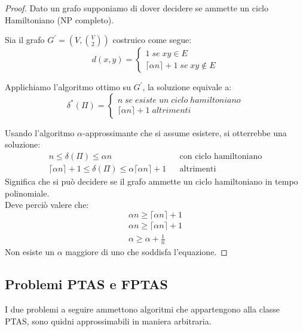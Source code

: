 \begin{proof}
    Dato un grafo supponiamo di dover decidere se ammette un ciclo Hamiltoniano (NP completo).

    Sia il grafo $G^\prime = (V, \binom{V}{2})$ costruico come segue:
    \[
        d(x,y) =     
        \begin{cases}
            1\;\mathit{se}\;xy \in E\\ 
            \lceil {\alpha n} \rceil + 1\;\mathit{se}\;xy \notin E        

        \end{cases}
    \]
    
    Applichiamo l'algoritmo ottimo su $G^\prime$, la soluzione equivale a:
    \[
        \delta^*(\Pi) =    
        \begin{cases}
            n\;\mathit{se\;esiste\;un\;ciclo\;hamiltoniano}\\ 
            \lceil \alpha n \rceil+ 1 \;\mathit{altrimenti}
        \end{cases}
    \]

    Usando l'algoritmo $\alpha$-approssimante che si assume esistere, 
    si otterrebbe una soluzione:
    \begin{equation}
        \begin{aligned}
            n \leq \delta(\Pi) \leq \alpha n && \text{con ciclo hamiltoniano}\\
            \lceil\alpha n \rceil+ 1 \leq \delta(\Pi) \leq \alpha\lceil \alpha n \rceil+ 1 && \text{altrimenti}
        \end{aligned}
    \end{equation}
    Significa che si può decidere se il grafo ammette un ciclo hamiltoniano in tempo polinomiale.\\
    Deve perciò valere che:
    $$\alpha n \geq \lceil \alpha n \rceil+ 1$$
    \begin{equation}
        \begin{aligned}
            \alpha n \geq \lceil \alpha n \rceil+ 1\\
            \alpha \geq \alpha + \frac{1}{n}
        \end{aligned}
    \end{equation}
    Non esiste un $\alpha$ maggiore di uno che soddisfa l'equazione.
\end{proof}

\subsection{Problemi PTAS e FPTAS}
I due problemi a seguire ammettono algoritmi che appartengono alla classe PTAS, sono 
quidni approssimabili in maniera arbitraria.


